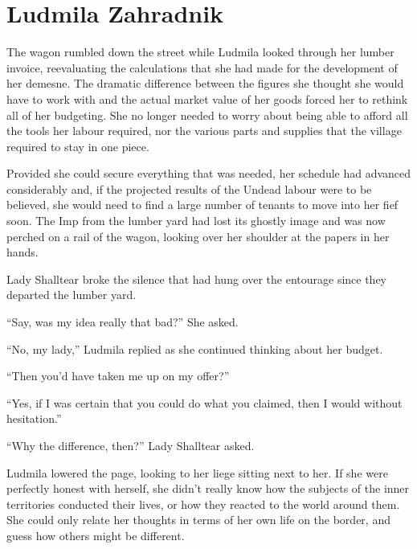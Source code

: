 \chapter{Ludmila Zahradnik}

The wagon rumbled down the street while Ludmila looked through her lumber invoice, reevaluating the calculations that she had made for the development of her demesne. The dramatic difference between the figures she thought she would have to work with and the actual market value of her goods forced her to rethink all of her budgeting. She no longer needed to worry about being able to afford all the tools her labour required, nor the various parts and supplies that the village required to stay in one piece.

 

Provided she could secure everything that was needed, her schedule had advanced considerably and, if the projected results of the Undead labour were to be believed, she would need to find a large number of tenants to move into her fief soon. The Imp from the lumber yard had lost its ghostly image and was now perched on a rail of the wagon, looking over her shoulder at the papers in her hands.

 

Lady Shalltear broke the silence that had hung over the entourage since they departed the lumber yard.

 

“Say, was my idea really that bad?” She asked.

 

“No, my lady,” Ludmila replied as she continued thinking about her budget.

 

“Then you’d have taken me up on my offer?”

 

“Yes, if I was certain that you could do what you claimed, then I would without hesitation.”

 

“Why the difference, then?” Lady Shalltear asked.

 

Ludmila lowered the page, looking to her liege sitting next to her. If she were perfectly honest with herself, she didn’t really know how the subjects of the inner territories conducted their lives, or how they reacted to the world around them. She could only relate her thoughts in terms of her own life on the border, and guess how others might be different.

